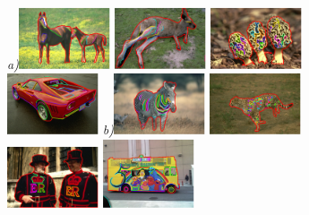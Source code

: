 \begin{figure}[ht]
\centering
{\footnotesize\textit{a)}}\includegraphics[width=0.241\textwidth]{figs/ic_horses.pdf}
\includegraphics[width=0.241\textwidth]{figs/ic_kang.pdf}
\includegraphics[width=0.241\textwidth]{figs/ic_mush.pdf}
\includegraphics[width=0.241\textwidth]{figs/ic_car.pdf}
{\footnotesize\textit{b)}}\includegraphics[width=0.241\textwidth]{figs/rr_stripes.pdf}
\includegraphics[width=0.241\textwidth]{figs/rr_spots.pdf}
\includegraphics[width=0.241\textwidth]{figs/rr_markings.pdf}
\includegraphics[width=0.241\textwidth]{figs/rr_bus2.pdf}

\end{figure}
